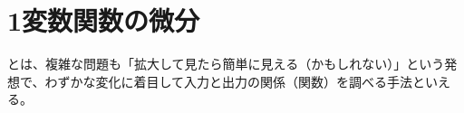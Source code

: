 \documentclass[../../topic_calculus]{subfiles}
\begin{document}
\chapter{1変数関数の微分}

とは、複雑な問題も「拡大して見たら簡単に見える（かもしれない）」という発想で、わずかな変化に着目して入力と出力の関係（関数）を調べる手法といえる。













\end{document}
